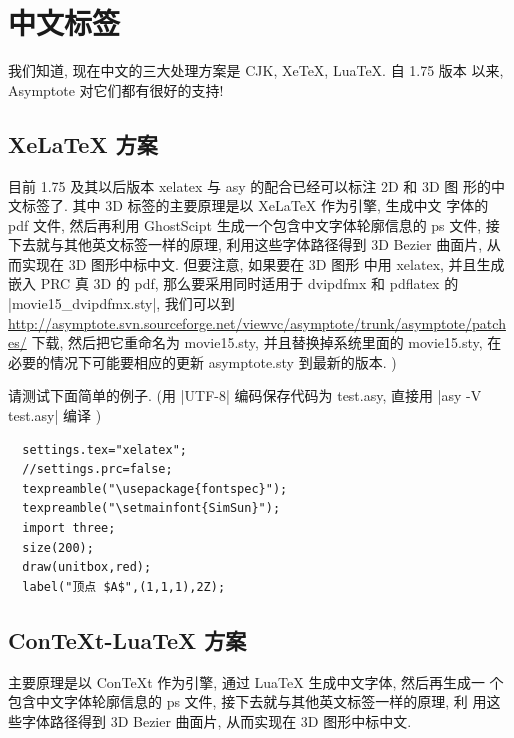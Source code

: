 \documentclass{ctexbook}
\begin{document}
\section{中文标签}
我们知道, 现在中文的三大处理方案是 CJK, XeTeX, LuaTeX. 自 1.75 版本
以来, Asymptote 对它们都有很好的支持!

\subsection{XeLaTeX 方案}
目前 1.75 及其以后版本 xelatex 与 asy 的配合已经可以标注 2D 和 3D 图
形的中文标签了. 其中 3D 标签的主要原理是以 XeLaTeX 作为引擎, 生成中文
字体的 pdf 文件, 然后再利用 GhostScipt 生成一个包含中文字体轮廓信息的
ps 文件, 接下去就与其他英文标签一样的原理, 利用这些字体路径得到 3D
Bezier 曲面片, 从而实现在 3D 图形中标中文.  但要注意, 如果要在 3D 图形
中用 xelatex, 并且生成嵌入 PRC 真 3D 的 pdf, 那么要采用同时适用于
dvipdfmx 和 pdflatex 的 |movie15_dvipdfmx.sty|, 我们可以到
\url{http://asymptote.svn.sourceforge.net/viewvc/asymptote/trunk/asymptote/patches/}
下载, 然后把它重命名为 movie15.sty, 并且替换掉系统里面的 movie15.sty,
在必要的情况下可能要相应的更新 asymptote.sty 到最新的版本. \label{movie15:xelatex})

请测试下面简单的例子. (用 |UTF-8| 编码保存代码为 test.asy, 直接用
|asy -V test.asy| 编译 )
\begin{lstlisting}
  settings.tex="xelatex";
  //settings.prc=false;
  texpreamble("\usepackage{fontspec}");
  texpreamble("\setmainfont{SimSun}");
  import three;
  size(200);
  draw(unitbox,red);
  label("顶点 $A$",(1,1,1),2Z);
\end{lstlisting}

\subsection{ConTeXt-LuaTeX 方案}
主要原理是以 ConTeXt 作为引擎, 通过 LuaTeX 生成中文字体, 然后再生成一
个包含中文字体轮廓信息的 ps 文件, 接下去就与其他英文标签一样的原理, 利
用这些字体路径得到 3D Bezier 曲面片, 从而实现在 3D 图形中标中文.
\end{document}
